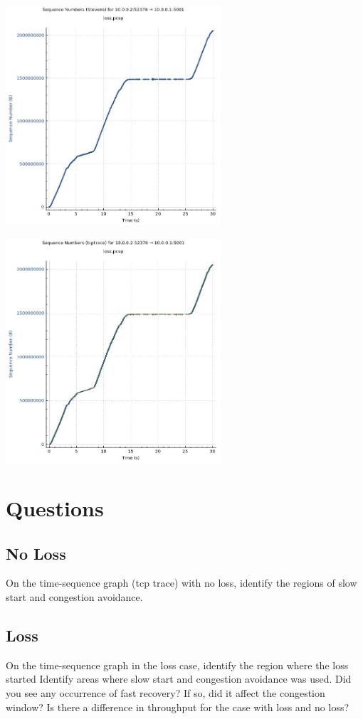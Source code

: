 \documentclass{article}
\begin{document}
    \includegraphics[width=8cm]{lossstevens}
    
    \includegraphics[width=8cm]{losstcptrace}

    \section*{Questions}
    \subsection*{No Loss}
    On the time-sequence graph (tcp trace) with no loss, identify the regions of slow start
and congestion avoidance.

    \subsection*{Loss}
    On the time-sequence graph in the loss case, identify the region where the loss started
    Identify areas where slow start and congestion avoidance was used.
    Did you see any occurrence of fast recovery? If so, did it affect the congestion window?
    Is there a difference in throughput for the case with loss and no loss?
\end{document}
